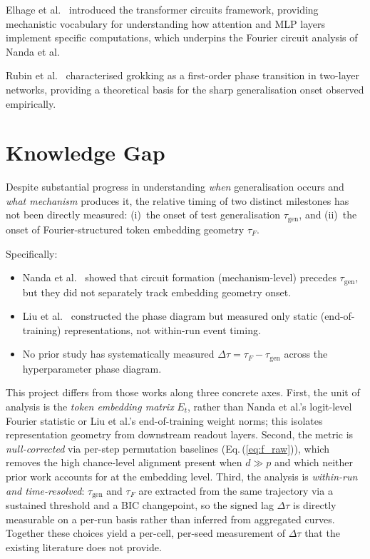 \documentclass[12pt,openany,a4paper]{book}
\newcommand{\eq}[1]  {Eq.\,(\ref{#1})}
\newcommand{\taug}{\tau_{\mathrm{gen}}}
\newcommand{\tauf}{\tau_{F}}
\newcommand{\Dtau}{\Delta\tau}
\begin{document}
Elhage et al.\ \cite{elhage2021mathematical} introduced the
transformer circuits framework, providing mechanistic vocabulary
for understanding how attention and MLP layers implement specific
computations, which underpins the Fourier circuit analysis of
Nanda et al.

Rubin et al.\ \cite{rubin2024grokking} characterised grokking as
a first-order phase transition in two-layer networks, providing a
theoretical basis for the sharp generalisation onset observed
empirically.

\section{Knowledge Gap}

Despite substantial progress in understanding \emph{when} generalisation
occurs and \emph{what mechanism} produces it, the relative timing of
two distinct milestones has not been directly measured:
(i)~the onset of test generalisation $\taug$, and
(ii)~the onset of Fourier-structured token embedding geometry $\tauf$.

Specifically:
\begin{itemize}
  \item Nanda et al.\ \cite{nanda2023progress} showed that circuit
    formation (mechanism-level) precedes $\taug$, but they did not
    separately track embedding geometry onset.
  \item Liu et al.\ \cite{liu2022towards} constructed the phase diagram
    but measured only static (end-of-training) representations, not
    within-run event timing.
  \item No prior study has systematically measured $\Dtau = \tauf - \taug$
    across the hyperparameter phase diagram.
\end{itemize}

This project differs from those works along three concrete axes.
First, the unit of analysis is the \emph{token embedding matrix} $E_t$,
rather than Nanda et al.'s logit-level Fourier statistic or Liu et al.'s
end-of-training weight norms; this isolates representation geometry
from downstream readout layers.
Second, the metric is \emph{null-corrected} via per-step permutation
baselines (\eq{eq:f_raw}), which removes the high chance-level
alignment present when $d \gg p$ and which neither prior work
accounts for at the embedding level.
Third, the analysis is \emph{within-run and time-resolved}: $\taug$
and $\tauf$ are extracted from the same trajectory via a sustained
threshold and a BIC changepoint, so the signed lag $\Dtau$ is
directly measurable on a per-run basis rather than inferred from
aggregated curves.
Together these choices yield a per-cell, per-seed measurement of
$\Dtau$ that the existing literature does not provide.
\end{document}
